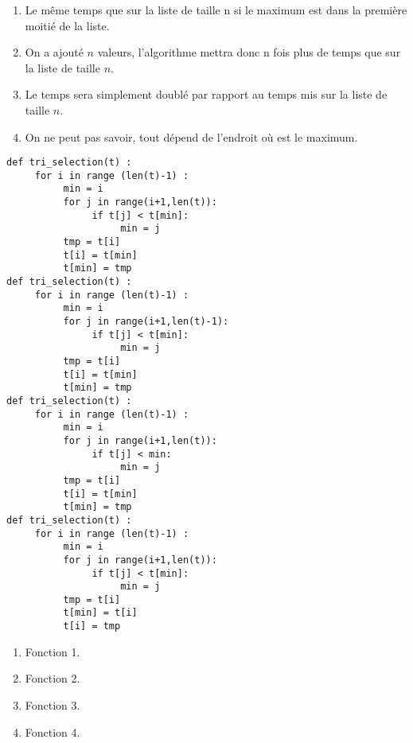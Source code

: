 
\begin{enumerate}
\item Le même temps que sur la liste de taille n si le maximum est dans la première moitié de la liste.
\item On a ajouté $n$ valeurs, l'algorithme mettra donc n fois plus de temps que sur la liste de taille $n$.
\item Le temps sera simplement doublé par rapport au temps mis sur la liste de taille $n$.%
\item On ne peut pas savoir, tout dépend de l'endroit où est le maximum.
\end{enumerate}

%

\begin{lstlisting}
def tri_selection(t) :
     for i in range (len(t)-1) :
          min = i		
          for j in range(i+1,len(t)):
               if t[j] < t[min]:
                    min = j
          tmp = t[i]
          t[i] = t[min]
          t[min] = tmp
def tri_selection(t) :
     for i in range (len(t)-1) :
          min = i		
          for j in range(i+1,len(t)-1):
               if t[j] < t[min]:
                    min = j
          tmp = t[i]
          t[i] = t[min]
          t[min] = tmp
def tri_selection(t) :
     for i in range (len(t)-1) :
          min = i		
          for j in range(i+1,len(t)):
               if t[j] < min:
                    min = j
          tmp = t[i]
          t[i] = t[min]
          t[min] = tmp
def tri_selection(t) :
     for i in range (len(t)-1) :
          min = i		
          for j in range(i+1,len(t)):
               if t[j] < t[min]:
                    min = j
          tmp = t[i]
          t[min] = t[i]
          t[i] = tmp
\end{lstlisting}
\begin{enumerate}
\item Fonction 1. %
\item Fonction 2.
\item Fonction 3.
\item Fonction 4.
\end{enumerate}

